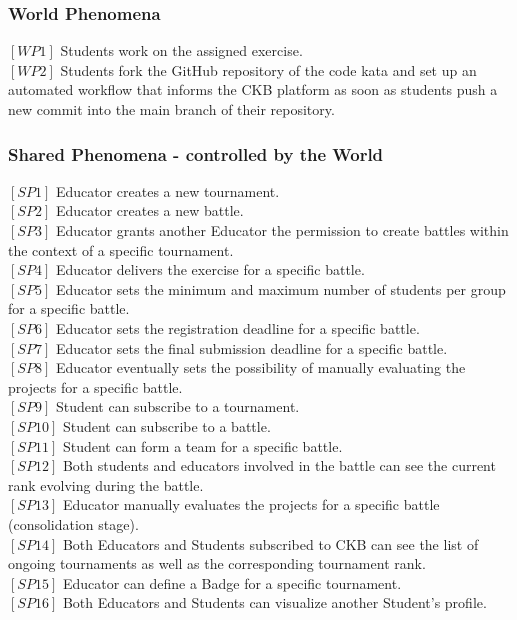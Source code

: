 \vspace{24pt}

\subsubsection{World Phenomena}
$[WP1]$ Students work on the assigned exercise.
\\$[WP2]$ Students fork the GitHub repository of the code kata and set up an automated workflow that informs the CKB platform as soon as students push a new commit into the main branch of their repository.

\vspace{12pt}

\subsubsection{Shared Phenomena - controlled by the World}
$[SP1]$ Educator creates a new tournament.
\\$[SP2]$ Educator creates a new battle.
\\$[SP3]$ Educator grants another Educator the permission to create battles within the context of a specific tournament.
\\$[SP4]$ Educator delivers the exercise for a specific battle.
\\$[SP5]$ Educator sets the minimum and maximum number of students per group for a specific battle.
\\$[SP6]$ Educator sets the registration deadline for a specific battle.
\\$[SP7]$ Educator sets the final submission deadline for a specific battle.
\\$[SP8]$ Educator eventually sets the possibility of manually evaluating the projects for a specific battle.
\\$[SP9]$ Student can subscribe to a tournament.
\\$[SP10]$ Student can subscribe to a battle.
\\$[SP11]$ Student can form a team for a specific battle.
\\$[SP12]$ Both students and educators involved in the battle can see the current rank evolving during the battle.
\\$[SP13]$ Educator manually evaluates the projects for a specific battle (consolidation stage).
\\$[SP14]$ Both Educators and Students subscribed to CKB can see the list of ongoing tournaments as well as the corresponding tournament rank.
\\$[SP15]$ Educator can define a Badge for a specific tournament.
\\$[SP16]$ Both Educators and Students can visualize another Student's profile.

